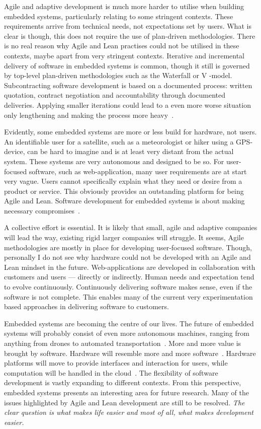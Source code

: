 \documentclass[english]{tktltiki2}
\begin{document}
Agile and adaptive development is much more harder to utilise when building embedded systems, particularly relating to some stringent contexts. These requirements arrive from technical needs, not expectations set by users. What is clear is though, this does not require the use of plan-driven methodologies. There is no real reason why Agile and Lean practises could not be utilised in these contexts, maybe apart from very stringent contexts. Iterative and incremental delivery of software in embedded systems is common, though it still is governed by top-level plan-driven methodologies such as the Waterfall or V -model. Subcontracting software development is based on a documented process: written quotation, contract negotiation and accountability through documented deliveries. Applying smaller iterations could lead to a even more worse situation only lengthening and making the process more heavy~\cite{Hol15b}.

Evidently, some embedded systems are more or less build for hardware, not users. An identifiable user for a satellite, such as a meteorologist or hiker using a GPS-device, can be hard to imagine and is at least very distant from the actual system. These systems are very autonomous and designed to be so. For user-focused software, such as web-application, many user requirements are at start very vague. Users cannot specifically explain what they need or desire from a product or service. This obviously provides an outstanding platform for being Agile and Lean. Software development for embedded systems is about making necessary compromises~\cite{BT15}.

A collective effort is essential. It is likely that small, agile and adaptive companies will lead the way, existing rigid larger companies will struggle. It seems, Agile methodologies are mostly in place for developing user-focused software. Though, personally I do not see why hardware could not be developed with an Agile and Lean mindset in the future. Web-applications are developed in collaboration with customers and users — directly or indirectly. Human needs and expectation tend to evolve continuously. Continuously delivering software makes sense, even if the software is not complete. This enables many of the current very experimentation based approaches in delivering software to customers.

Embedded systems are becoming the centre of our lives. The future of embedded systems will probably consist of even more autonomous machines, ranging from anything from drones to automated transportation~\cite{Kri15}. More and more value is brought by software. Hardware will resemble more and more software~\cite{Hol15a}. Hardware platforms will move to provide interfaces and interaction for users, while computation will be handled in the cloud~\cite{BT15}. The flexibility of software development is vastly expanding to different contexts. From this perspective, embedded systems presents an interesting area for future research. Many of the issues highlighted by Agile and Lean development are still to be resolved. \emph{The clear question is what makes life easier and most of all, what makes development easier.}
\end{document}
